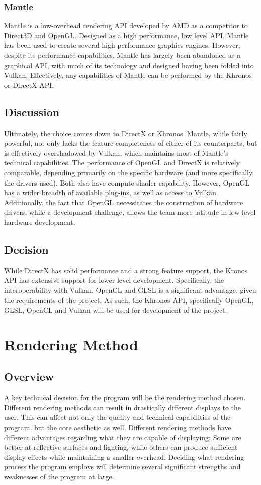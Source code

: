 \documentclass[onecolumn, draftclsnofoot,10pt, compsoc]{IEEEtran}
\begin{document}
\subsubsection{Mantle}
Mantle is a low-overhead rendering API developed by AMD as a competitor to Direct3D and OpenGL. Designed as a high performance, low level API, Mantle has been used to create several high performance graphics engines. However, despite its performance capabilities, Mantle has largely been abandoned as a graphical API, with much of its technology and designed having been folded into Vulkan. Effectively, any capabilities of Mantle can be performed by the Khronos or DirectX API.

\subsection{Discussion}
Ultimately, the choice comes down to DirectX or Khronos. Mantle, while fairly powerful, not only lacks the feature completeness of either of its counterparts, but is effectively overshadowed by Vulkan, which maintains most of Mantle's technical capabilities. The performance of OpenGL and DirectX is relatively comparable, depending primarily on the specific hardware (and more specifically, the drivers used). Both also have compute shader capability. However, OpenGL has a wider breadth of available plug-ins, as well as access to Vulkan. Additionally, the fact that OpenGL necessitates the construction of hardware drivers, while a development challenge, allows the team more latitude in low-level hardware development.

\subsection{Decision}
While DirectX has solid performance and a strong feature support, the Kronos API has extensive support for lower level development. Specifically, the interoperability with Vulkan, OpenCL and GLSL is a significant advantage, given the requirements of the project. As such, the Khronos API, specifically OpenGL, GLSL, OpenCL and Vulkan will be used for development of the project.

\section{Rendering Method}

\subsection{Overview}
A key technical decision for the program will be the rendering method chosen. Different rendering methods can result in drastically different displays to the user. This can affect not only the quality and technical capabilities of the program, but the core aesthetic as well. Different rendering methods have different advantages regarding what they are capable of displaying; Some are better at reflective surfaces and lighting, while others can produce sufficient display effects while maintaining a smaller overhead. Deciding what rendering process the program employs will determine several significant strengths and weaknesses of the program at large.
\end{document}
